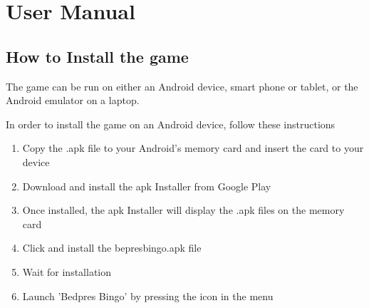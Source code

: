 \section{User Manual}
\label{usermanual}

\subsection{How to Install the game}
The game can be run on either an Android device, smart phone or tablet, or the Android emulator on a laptop. 

In order to install the game on an Android device, follow these instructions
\begin{enumerate}
\item{Copy the .apk file to your Android's memory card and insert the card to your device}
\item{Download and install the apk Installer from Google Play \cite{https://play.google.com/store/search?q=apps+installer&c=apps&safe=3}}
\item{Once installed, the apk Installer will display the .apk files on the memory card}
\item{Click and install the bepresbingo.apk file}
\item{Wait for installation}
\item{Launch 'Bedpres Bingo' by pressing the icon in the menu}
\end{enumerate}

